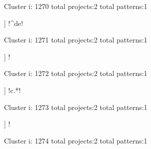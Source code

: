 Cluster i: 1270
total projects:2
total patterns:1
\begin{multicols}{1}
\begin{description}[noitemsep,topsep=0pt]
\item [[2] ] \cverb!^de!
\end{description}
\end{multicols}







Cluster i: 1271
total projects:2
total patterns:1
\begin{multicols}{1}
\begin{description}[noitemsep,topsep=0pt]
\item [[2] ] \cverb!%
\end{description}
\end{multicols}







Cluster i: 1272
total projects:2
total patterns:1
\begin{multicols}{1}
\begin{description}[noitemsep,topsep=0pt]
\item [[2] ] \cverb!c.*!
\end{description}
\end{multicols}







Cluster i: 1273
total projects:2
total patterns:1
\begin{multicols}{1}
\begin{description}[noitemsep,topsep=0pt]
\item [[2] ] \cverb!%
\end{description}
\end{multicols}







Cluster i: 1274
total projects:2
total patterns:1
\begin{multicols}{1}
\end{multicols}







